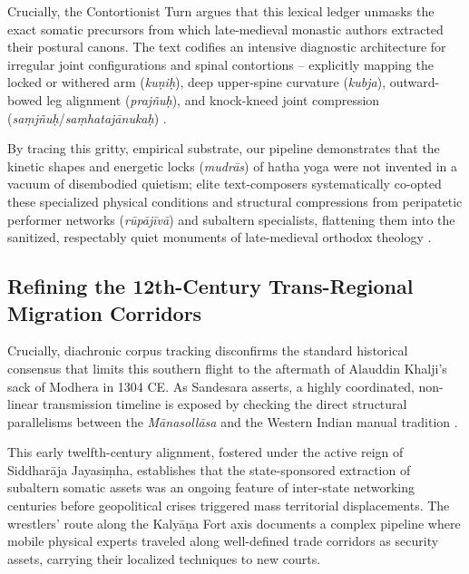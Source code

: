 \documentclass[11pt,twoside,letterpaper]{article}
\begin{document}
Crucially, the Contortionist Turn argues that this lexical ledger unmasks the exact somatic precursors from which late-medieval monastic authors extracted their postural canons. The text codifies an intensive diagnostic architecture for irregular joint configurations and spinal contortions -- explicitly mapping the locked or withered arm (\textit{kuṇiḥ}), deep upper-spine curvature (\textit{kubja}), outward-bowed leg alignment (\textit{prajñuḥ}), and knock-kneed joint compression (\textit{saṃjñuḥ}/\textit{saṃhatajānukaḥ}) \citep{Berger2023}. 

By tracing this gritty, empirical substrate, our pipeline demonstrates that the kinetic shapes and energetic locks (\textit{mudrās}) of hatha yoga were not invented in a vacuum of disembodied quietism; elite text-composers systematically co-opted these specialized physical conditions and structural compressions from peripatetic performer networks (\textit{rūpājīvā}) and subaltern specialists, flattening them into the sanitized, respectably quiet monuments of late-medieval orthodox theology \citep{Berger2023, Birch2024, Wujastyk2025}.

\subsection{Refining the 12th-Century Trans-Regional Migration Corridors}
Crucially, diachronic corpus tracking disconfirms the standard historical consensus that limits this southern flight to the aftermath of Alauddin Khalji's sack of Modhera in 1304 CE. As Sandesara asserts, a highly coordinated, non-linear transmission timeline is exposed by checking the direct structural parallelisms between the \textit{Mānasollāsa} and the Western Indian manual tradition \citep{Sandesara1948}. 

This early twelfth-century alignment, fostered under the active reign of Siddharāja Jayasiṃha, establishes that the state-sponsored extraction of subaltern somatic assets was an ongoing feature of inter-state networking centuries before geopolitical crises triggered mass territorial displacements. The wrestlers' route along the Kalyāṇa Fort axis documents a complex pipeline where mobile physical experts traveled along well-defined trade corridors as security assets, carrying their localized techniques to new courts.

\end{document}
